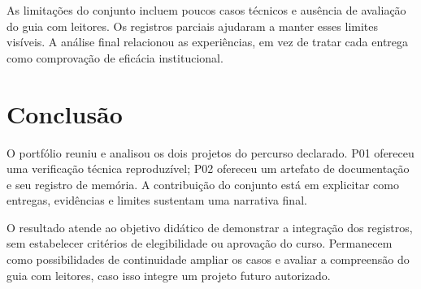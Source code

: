 As limitações do conjunto incluem poucos casos técnicos e ausência de avaliação
do guia com leitores. Os registros parciais ajudaram a manter esses limites
visíveis. A análise final relacionou as experiências, em vez de tratar cada
entrega como comprovação de eficácia institucional.

\chapter{Conclusão}
O portfólio reuniu e analisou os dois projetos do percurso declarado. P01
ofereceu uma verificação técnica reproduzível; P02 ofereceu um artefato de
documentação e seu registro de memória. A contribuição do conjunto está em
explicitar como entregas, evidências e limites sustentam uma narrativa final.

O resultado atende ao objetivo didático de demonstrar a integração dos registros,
sem estabelecer critérios de elegibilidade ou aprovação do curso. Permanecem
como possibilidades de continuidade ampliar os casos e avaliar a compreensão
do guia com leitores, caso isso integre um projeto futuro autorizado.

